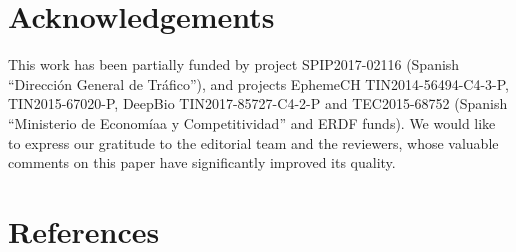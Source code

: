 \documentclass[preprint]{elsarticle}
\begin{document}
\section*{Acknowledgements}

This work has been partially funded by project SPIP2017-02116 (Spanish ``Direcci\'on General de Tr\'afico''), and projects EphemeCH TIN2014-56494-C4-3-P, TIN2015-67020-P, DeepBio TIN2017-85727-C4-2-P  and TEC2015-68752 (Spanish ``Ministerio de
Econom{\'ia}a y Competitividad'' and ERDF funds).
We would like to express our gratitude to the editorial team and the reviewers, whose valuable comments on this paper have significantly improved its quality.

\section*{References}



\end{document}
